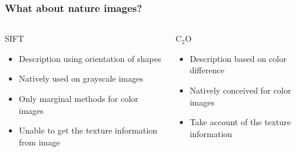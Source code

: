 \documentclass[xcolor=table]{beamer}
\begin{document}
\begin{frame} \frametitle{What about nature images?}


\begin{columns}[t]
  \begin{column}{5cm}
  \begin{block}{SIFT}
	\begin{itemize}
		\item Description using orientation of shapes
		\item Natively used on grayscale images
		\item Only marginal methods for color images
		\item Unable to get the texture information from image
	\end{itemize}
  \end{block}
  \end{column}

  \begin{column}{5cm}
  \begin{block}{C$_2$O}
  \begin{itemize}
		\item Description based on color difference
		\item Natively conceived for color images
		\item Take account of the texture information
  \end{itemize}
  \end{block}
  \end{column}
 \end{columns}
\end{frame}
\end{document}
